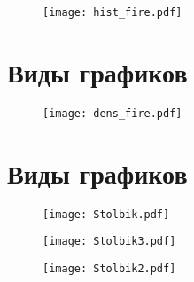 \documentclass[xcolor=dvipsnames, 12pt]{beamer}
\begin{document}
\begin{frame}

\begin{figure}[h!]
\hspace*{-1cm}
 \centering
 \texttt{[image: hist\_fire.pdf]}

\end{figure}

\end{frame}

\section{Виды графиков }

\begin{frame}

\begin{figure}[h!]
\hspace*{-1cm}
 \centering
 \texttt{[image: dens\_fire.pdf]}

\end{figure}

\end{frame}

\section{Виды графиков }

\begin{frame}

\begin{figure}[h!]
\hspace*{-1cm}
 \centering
 \texttt{[image: Stolbik.pdf]}

\end{figure}

\end{frame}

\begin{frame}

\begin{figure}[h!]
\hspace*{-1cm}
 \centering
 \texttt{[image: Stolbik3.pdf]}

\end{figure}

\end{frame}

\begin{frame}

\begin{figure}[h!]
\hspace*{-1cm}
 \centering
 \texttt{[image: Stolbik2.pdf]}

\end{figure}

\end{frame}
\end{document}
